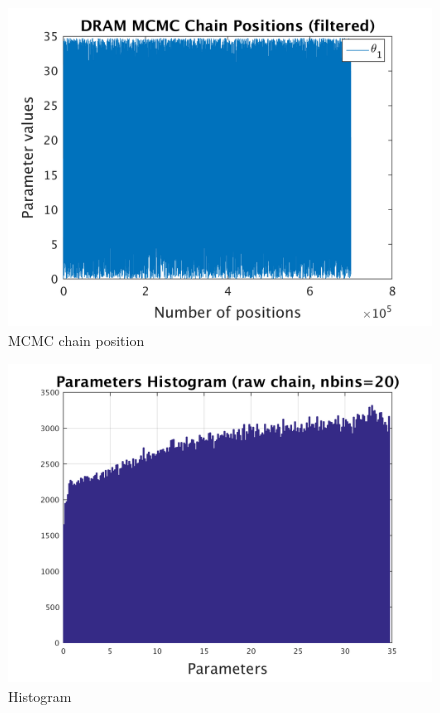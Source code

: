 \begin{figure}[h!]
  
  \centering
   \includegraphics[scale=0.75]{output_900000/simple_ip_chain_pos_filt}
   \caption{MCMC chain position }
\end{figure}


\begin{figure}[h!]
  
  \centering
   \includegraphics[scale=0.75]{output_900000/simple_ip_hist_raw}
   \caption{Histogram}
\end{figure}



